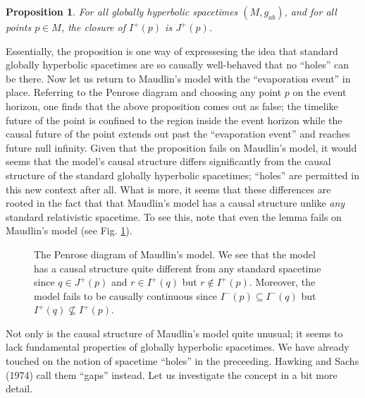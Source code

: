 \documentclass[authoryear,12pt,3p]{jowarticle}
\newtheorem{prop}[thm]{Proposition}
\begin{document}
\begin{prop}For all globally hyperbolic spacetimes $(M,g_{ab})$, and for all points $p \in M$, the closure of $I^+(p)$ is $J^+(p)$. \end{prop}

Essentially, the proposition is one way of expressesing the idea that standard globally hyperbolic spacetimes are so causally well-behaved that no ``holes'' can be there. Now let us return to Maudlin's model with the ``evaporation event'' in place. Referring to the Penrose diagram and choosing any point $p$ on the event horizon, one finds that the above proposition comes out as false; the timelike future of the point is confined to the region inside the event horizon while the causal future of the point extends out past the ``evaporation event'' and reaches future null infinity. Given that the proposition fails on Maudlin's model, it would seems that the model's causal structure differs significantly from the causal structure of the standard globally hyperbolic spacetimes;  ``holes'' are permitted in this new context after all. What is more, it seems that these differences are rooted in the fact that that Maudlin's model has a causal structure unlike {\em any} standard relativistic spacetime. To see this, note that even the lemma fails on Maudlin's model (see Fig. \ref{CausCon}).

\begin{figure}[h]
   \caption{\label{CausCon} The Penrose diagram of Maudlin's model. We see that the model has a causal structure quite different from any standard spacetime since $q \in J^+(p)$ and $r \in I^+(q)$ but $r \notin I^+(p)$. Moreover, the model fails to be causally continuous since $I^-(p) \subseteq I^-(q)$ but $I^+(q) \nsubseteq I^+(p)$.  }
\end{figure}


Not only is the causal structure of Maudlin's model quite unusual; it seems to lack fundamental properties of globally hyperbolic spacetimes. We have already touched on the notion of spacetime ``holes'' in the preceeding. Hawking and Sachs (1974) call them ``gaps'' instead. Let us investigate the concept in a bit more detail.
\end{document}
